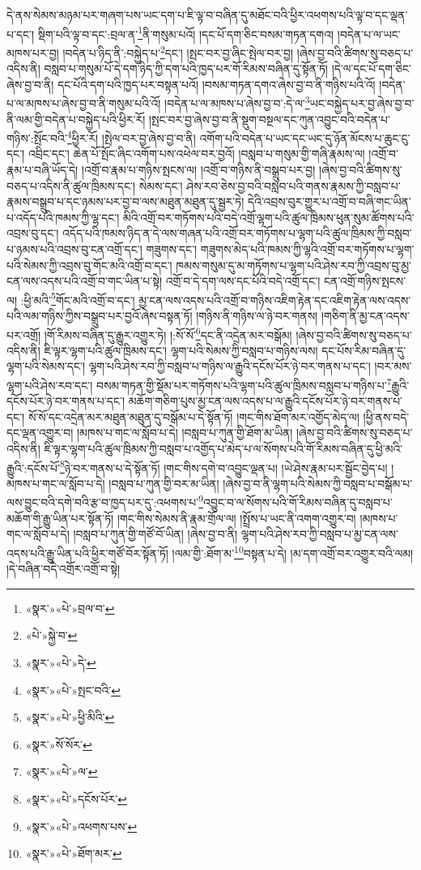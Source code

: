 དེ་ནས་སེམས་མཉམ་པར་གཞག་པས་ཡང་དག་པ་ཇི་ལྟ་བ་བཞིན་དུ་མཐོང་བའི་ཕྱིར་འཕགས་པའི་ལྟ་བ་དང་ལྡན་པ་དང་། སྡིག་པའི་ལྟ་བ་དང་:བྲལ་ན་\footnote{«སྣར་»«པེ་»བྲལ་བ་}ནི་གསུམ་པའོ། །དང་པོ་དག་ཅིང་བསམ་གཏན་དགའ། །བདེན་པ་ལ་ཡང་མཁས་པར་བྱ། །བདེན་པ་ཉིད་ནི་:བསྐྱེད་པ་\footnote{«པེ་»སྐྱེ་བ་}དང་། །སྤང་བར་བྱ་ཞིང་སྤེལ་བར་བྱ། །ཞེས་བྱ་བའི་ཚིགས་སུ་བཅད་པ་འདིས་ནི། བསླབ་པ་གསུམ་པོ་དེ་དག་ཉིད་ཀྱི་དག་པའི་ཁྱད་པར་གོ་རིམས་བཞིན་དུ་སྟོན་ཏོ། །དེ་ལ་དང་པོ་དག་ཅིང་ཞེས་བྱ་བ་ནི། དང་པོའི་དག་པའི་ཁྱད་པར་བསྟན་པའོ། །བསམ་གཏན་དགའ་ཞེས་བྱ་བ་ནི་གཉིས་པའི་འོ། །བདེན་པ་ལ་མཁས་པ་ཞེས་བྱ་བ་ནི་གསུམ་པའི་འོ། །བདེན་པ་ལ་མཁས་པ་ཞེས་བྱ་བ་:དེ་ལ་\footnote{«སྣར་»«པེ་»དེ་}ཡང་བསྐྱེད་པར་བྱ་ཞེས་བྱ་བ་ནི་ལམ་གྱི་བདེན་པ་བསྐྱེད་པའི་ཕྱིར་རོ། །སྤང་བར་བྱ་ཞེས་བྱ་བ་ནི་སྡུག་བསྔལ་དང་ཀུན་འབྱུང་བའི་བདེན་པ་གཉིས་:སྤོང་བའི་\footnote{«སྣར་»«པེ་»སྤང་བའི་}ཕྱིར་རོ། །སྤེལ་བར་བྱ་ཞེས་བྱ་བ་ནི། འགོག་པའི་བདེན་པ་ཡང་དང་ཡང་དུ་ཉོན་མོངས་པ་ཆུང་ངུ་དང་། འབྲིང་དང་། ཆེན་པོ་སྤོང་ཞིང་འགོག་པས་འཕེལ་བར་བྱའོ། །བསླབ་པ་གསུམ་གྱི་གཞི་རྣམས་ལ། །འགྲོ་བ་རྣམ་པ་བཞི་ཡོད་དེ། །འགྲོ་བ་རྣམ་པ་གཉིས་སྤངས་ལ། །འགྲོ་བ་གཉིས་ནི་བསྒྲུབ་པར་བྱ། །ཞེས་བྱ་བའི་ཚིགས་སུ་བཅད་པ་འདིས་ནི་ཚུལ་ཁྲིམས་དང་། སེམས་དང་། ཤེས་རབ་ཅེས་བྱ་བའི་བསླབ་པའི་གནས་རྣམས་ཀྱི་བསླབ་པ་རྣམས་བསྒྲུབ་པ་དང་ཉམས་པར་བྱ་བ་ལས་མཐུན་མཐུན་དུ་སྦྱར་ཏེ། དེའི་འབྲས་བུར་གྱུར་པ་འགྲོ་བ་བཞི་གང་ཡིན་པ་འདོད་པའི་ཁམས་ཀྱི་ལྷ་དང་། མིའི་འགྲོ་བར་གཏོགས་པའི་བདེ་འགྲོ་ལྷག་པའི་ཚུལ་ཁྲིམས་ཕུན་སུམ་ཚོགས་པའི་འབྲས་བུ་དང་། འདོད་པའི་ཁམས་ཉིད་ན་དེ་ལས་གཞན་པའི་འགྲོ་བར་གཏོགས་པ་ལྷག་པའི་ཚུལ་ཁྲིམས་ཀྱི་བསླབ་པ་ཉམས་པའི་འབྲས་བུ་ངན་འགྲོ་དང་། གཟུགས་དང་། གཟུགས་མེད་པའི་ཁམས་ཀྱི་ལྷའི་འགྲོ་བར་གཏོགས་པ་ལྷག་པའི་སེམས་ཀྱི་འབྲས་བུ་གོང་མའི་འགྲོ་བ་དང་། ཁམས་གསུམ་དུ་མ་གཏོགས་པ་ལྷག་པའི་ཤེས་རབ་ཀྱི་འབྲས་བུ་མྱ་ངན་ལས་འདས་པའི་འགྲོ་བ་གང་ཡིན་པ་སྟེ། འགྲོ་བ་དེ་དག་ལས་དང་པོའི་བདེ་འགྲོ་དང་། ངན་འགྲོ་གཉིས་སྤངས་ལ། :ཕྱི་མའི་\footnote{«སྣར་»«པེ་»ཕྱི་མིའི་}གོང་མའི་འགྲོ་བ་དང་། མྱ་ངན་ལས་འདས་པའི་འགྲོ་བ་གཉིས་འཇིག་རྟེན་དང་འཇིག་རྟེན་ལས་འདས་པའི་ལམ་གཉིས་ཀྱིས་བསྒྲུབ་པར་བྱའོ་ཞེས་བསྟན་ཏོ། །གཉིས་ནི་གཉིས་ལ་ཉེ་བར་གནས། །གཅིག་ནི་མྱ་ངན་འདས་པར་འགྲོ། །གོ་རིམས་བཞིན་དུ་རྒྱུར་འགྱུར་ཏེ། །:སོ་སོ་\footnote{«སྣར་»སོ་སོར་}དང་ནི་འདྲེན་མར་བསྒོམ། །ཞེས་བྱ་བའི་ཚིགས་སུ་བཅད་པ་འདིས་ནི། ཇི་ལྟར་ལྷག་པའི་ཚུལ་ཁྲིམས་དང་། ལྷག་པའི་སེམས་ཀྱི་བསླབ་པ་གཉིས་ལས། དང་པོས་རིམ་བཞིན་དུ་ལྷག་པའི་སེམས་དང་། ལྷག་པའི་ཤེས་རབ་ཀྱི་བསླབ་པ་གཉིས་ལ་རྒྱུའི་དངོས་པོར་ཉེ་བར་གནས་པ་དང་། །བར་མས་ལྷག་པའི་ཤེས་རབ་དང་། བསམ་གཏན་གྱི་སྡོམ་པར་གཏོགས་པའི་ལྷག་པའི་ཚུལ་ཁྲིམས་བསླབ་པ་གཉིས་པ་\footnote{«སྣར་»«པེ་»ལ་}རྒྱུའི་དངོས་པོར་ཉེ་བར་གནས་པ་དང་། མཆོག་གཅིག་པུས་མྱ་ངན་ལས་འདས་པ་ལ་རྒྱུའི་དངོས་པོར་ཉེ་བར་གནས་པ་དང་། སོ་སོ་དང་འདྲེན་མར་མཐུན་མཐུན་དུ་བསྒོམ་པ་དེ་སྟོན་ཏོ། །གང་གིས་ཐོག་མར་འགྱོད་མེད་ལ། །ཕྱི་ནས་བདེ་དང་ལྡན་འགྱུར་བ། །མཁས་པ་གང་ལ་སློབ་པ་དེ། །བསླབ་པ་ཀུན་གྱི་ཐོག་མ་ཡིན། །ཞེས་བྱ་བའི་ཚིགས་སུ་བཅད་པ་འདིས་ནི། ཇི་ལྟར་ལྷག་པའི་ཚུལ་ཁྲིམས་ཀྱི་བསླབ་པ་འགྱོད་པ་མེད་པ་ལ་སོགས་པའི་གོ་རིམས་བཞིན་དུ་ཕྱི་མའི་རྒྱུའི་:དངོས་པོ་\footnote{«སྣར་»«པེ་»དངོས་པོར་}ཉེ་བར་གནས་པ་དེ་སྟོན་ཏོ། །གང་གིས་དགེ་བ་འབྱུང་ལྡན་པ། །ཡེ་ཤེས་རྣམ་པར་སྦྱོང་བྱེད་པ། །མཁས་པ་གང་ལ་སློབ་པ་དེ། །བསླབ་པ་ཀུན་གྱི་བར་མ་ཡིན། །ཞེས་བྱ་བ་ནི་ལྷག་པའི་སེམས་ཀྱི་བསླབ་པ་བསྒོམ་པ་ལས་བྱུང་བའི་དགེ་བའི་རྩ་བ་ཁྱད་པར་དུ་:འཕགས་པ་\footnote{«སྣར་»«པེ་»འཕགས་པས་}འབྱུང་བ་ལ་སོགས་པའི་གོ་རིམས་བཞིན་དུ་བསླབ་པ་མཆོག་གི་རྒྱུ་ཡིན་པར་སྟོན་ཏོ། །གང་གིས་སེམས་ནི་རྣམ་གྲོལ་ལ། །སྤྲོས་པ་ཡང་ནི་འགག་འགྱུར་བ། །མཁས་པ་གང་ལ་སློབ་པ་དེ། །བསླབ་པ་ཀུན་གྱི་གཙོ་བོ་ཡིན། །ཞེས་བྱ་བ་ནི། ལྷག་པའི་ཤེས་རབ་ཀྱི་བསླབ་པ་མྱ་ངན་ལས་འདས་པའི་རྒྱུ་ཡིན་པའི་ཕྱིར་གཙོ་བོར་སྟོན་ཏོ། །ལམ་གྱི་:ཐོག་མ་\footnote{«སྣར་»«པེ་»ཐོག་མར་}བསྟན་པ་དེ། །མ་དག་འགྲོ་བར་འགྱུར་བའི་ལམ། །དེ་བཞིན་བདེ་འགྲོར་འགྲོ་བ་སྟེ། 